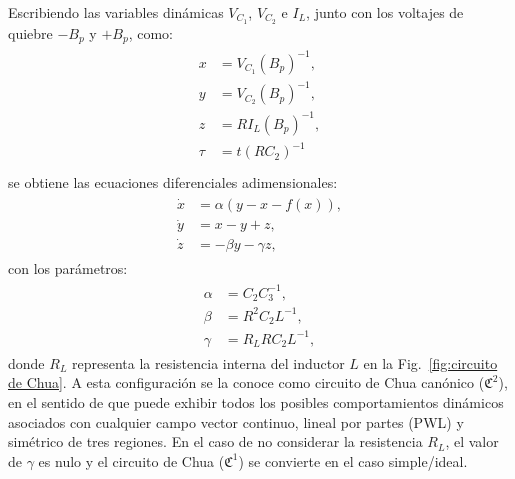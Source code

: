 \documentclass{article}
\begin{document}
    Escribiendo las variables dinámicas $V_{C_1}$, $V_{C_2}$ e $I_L$, junto con los voltajes de quiebre $-B_{p}$ y $+B_{p}$, como:
    \begin{eqnarray}
        \begin{aligned}
            x & = V_{C_1}(B_p)^{-1},\\
            y & = V_{C_2}(B_p)^{-1},\\ 
            z & = RI_L(B_p)^{-1},\\ 
            \tau & = t(RC_2)^{-1}\\
        \end{aligned}
    \end{eqnarray}
    se obtiene las ecuaciones diferenciales adimen\-sio\-na\-les:
    \begin{eqnarray}\label{Chua eq dif}
        \begin{aligned}
            \dot{x} &= \alpha(y - x - f(x)),\\
            \dot{y} &= x-y+z,\\
            \dot{z} &= -\beta y - \gamma z,
        \end{aligned}
    \end{eqnarray}
    con los parámetros:
    \begin{eqnarray}\label{alfa beta gamma}
        \begin{aligned}
            \alpha & = C_{2} C_{3}^{-1},\\
            \beta & = R^{2} C_2 L^{-1}, \\
            \gamma & = R_{L} RC_{2} L^{-1},
        \end{aligned}
    \end{eqnarray}
    donde $R_L$ representa la resistencia interna del inductor $L$ en la Fig.~\ref{fig:circuito de Chua}. A esta configuración se la conoce como circuito de Chua canónico ($\mathfrak{C}^2$), en el sentido de que puede exhibir todos los posibles comportamientos dinámicos asociados con cualquier campo vector continuo, lineal por partes (PWL) y simétrico de tres regiones. En el caso de no con\-si\-de\-rar la resistencia $R_L$, el valor de $\gamma$ es nulo y el circuito de Chua ($\mathfrak{C}^1$) se convierte en el caso simple/ideal.
\end{document}
